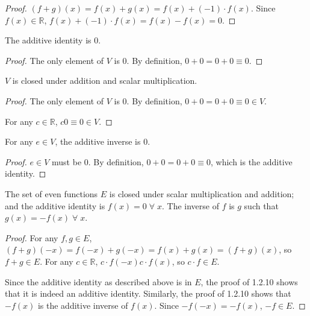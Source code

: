 \begin{proof}
    $(f + g)(x) = f(x) + g(x) = f(x) + (-1) \cdot f(x)$. Since $f(x) \in \mathbb{R}$, $f(x) + (-1) \cdot f(x) = f(x) - f(x) = 0$.
\end{proof}


\begin{lemma}
    The additive identity is $0$.
\end{lemma}

\begin{proof}
    The only element of $V$ is $0$. By definition, $0 + 0 = 0 + 0 \equiv 0$.
\end{proof}

\begin{lemma}
    $V$ is closed under addition and scalar multiplication.
\end{lemma}

\begin{proof}
    The only element of $V$ is $0$. By definition, $0 + 0 = 0 + 0 \equiv 0 \in V$.

    For any $c \in \mathbb{R}$, $c0 \equiv 0 \in V$.
\end{proof}

\begin{lemma}
    For any $e \in V$, the additive inverse is $0$.
\end{lemma}

\begin{proof}
    $e \in V$ must be $0$. By definition, $0 + 0 = 0 + 0 \equiv 0$, which is the additive identity.
\end{proof}


The set of even functions $E$ is closed under scalar multiplication and addition; and the additive identity is $f(x) = 0 \;\forall\; x$. The inverse of $f$ is $g$ such that $g(x) = -f(x) \;\forall\; x$.

\begin{proof}
    For any $f, g \in E$, $(f + g)(-x) = f(-x) + g(-x) = f(x) + g(x) = (f + g)(x)$, so $f + g \in E$. For any $c \in \mathbb{R}$, $c \cdot f(-x) c \cdot f(x)$, so $c \cdot f \in E$.

    Since the additive identity as described above is in $E$, the proof of 1.2.10 shows that it is indeed an additive identity. Similarly, the proof of 1.2.10 shows that $-f(x)$ is the additive inverse of $f(x)$. Since $-f(-x) = -f(x)$, $-f \in E$.
\end{proof}

